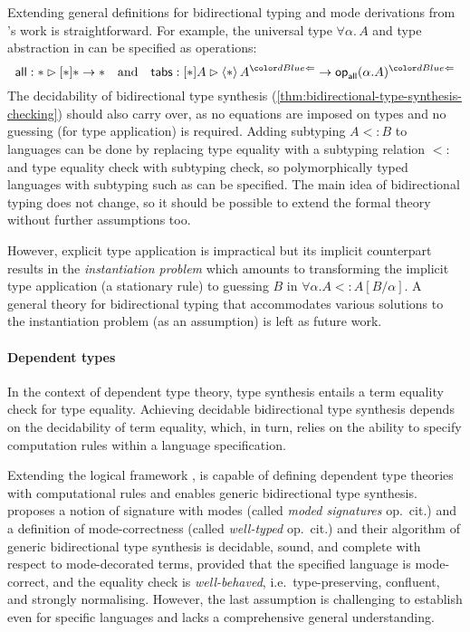 Extending general definitions for bidirectional typing and mode derivations from \citeauthor{Hamana2011}'s work is straightforward. 
For example, the universal type $\forall \alpha.\, A$ and type abstraction in \SystemF can be specified as operations:
\[
\mathsf{all} : * \rhd [*] * \to *
\quad\text{and}\quad
\mathsf{tabs} : [*] A \rhd \left< * \right> A^{\chk} \to \tyOp_{\mathsf{all}}(\alpha. A)^{\chk}
\]
The decidability of bidirectional type synthesis (\cref{thm:bidirectional-type-synthesis-checking}) should also carry over, as no equations are imposed on types and no guessing (for type application) is required.
Adding subtyping $A \mathrel{<:} B$ to languages can be done by replacing type equality with a subtyping relation $\mathrel{<:}$ and type equality check with subtyping check, so polymorphically typed languages with subtyping such as \SystemFsub can be specified.
The main idea of bidirectional typing does not change, so it should be possible to extend the formal theory without further assumptions too.

However, explicit type application is impractical but its implicit counterpart results in the \emph{instantiation problem} which amounts to transforming the implicit type application (a stationary rule) to guessing $B$ in $\forall \alpha. A <: A[B/\alpha]$.
A general theory for bidirectional typing that accommodates various solutions to the instantiation problem (as an assumption) is left as future work.

\paragraph{Dependent types}
In the context of dependent type theory, type synthesis entails a term equality check for type equality.
Achieving decidable bidirectional type synthesis depends on the decidability of term equality, which, in turn, relies on the ability to specify computation rules within a language specification.

Extending the logical framework \Dedukti,  is capable of defining dependent type theories with computational rules and enables generic bidirectional type synthesis.
\citeauthor{Felicissimo2023} proposes a notion of \LF signature with modes (called \emph{moded signatures} op.\ cit.) and a definition of mode-correctness (called \emph{well-typed} op.\ cit.) and their algorithm of generic bidirectional type synthesis is decidable, sound, and complete with respect to mode-decorated terms, provided that the specified language is mode-correct, and the equality check is \emph{well-behaved}, i.e.\ type-preserving, confluent, and strongly normalising.
However, the last assumption is challenging to establish even for specific languages and lacks a comprehensive general understanding.

